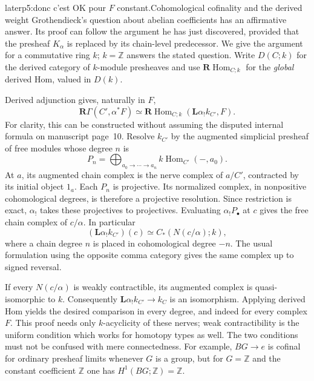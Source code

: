 \begin{dcomment}{later}{p5:donc c'est OK pour $F$ constant.}{Cohomological cofinality and the derived weight}
Grothendieck's question about abelian coefficients has an affirmative answer. Its proof can follow the argument he has just discovered, provided that the presheaf $K_\alpha$ is replaced by its chain-level predecessor. We give the argument for a commutative ring $k$; $k=\mathbb Z$ answers the stated question. Write $D(C;k)$ for the derived category of $k$-module presheaves and use $\mathbf R\operatorname{Hom}_{C;k}$ for the \emph{global} derived Hom, valued in $D(k)$.

Derived adjunction gives, naturally in $F$,
\[
 \mathbf R\Gamma(C',\alpha^*F)
 \simeq
 \mathbf R\operatorname{Hom}_{C;k}
       (\mathbf L\alpha_!k_{C'},F).
\]
For clarity, this can be constructed without assuming the disputed internal formula on manuscript page~10. Resolve $k_{C'}$ by the augmented simplicial presheaf of free modules whose degree $n$ is
\[
 P_n=\bigoplus_{a_0\to\cdots\to a_n} k\operatorname{Hom}_{C'}(-,a_0).
\]
At $a$, its augmented chain complex is the nerve complex of $a/C'$, contracted by its initial object $1_a$. Each $P_n$ is projective. Its normalized complex, in nonpositive cohomological degrees, is therefore a projective resolution. Since restriction is exact, $\alpha_!$ takes these projectives to projectives. Evaluating $\alpha_!P_\bullet$ at $c$ gives the free chain complex of $c/\alpha$. In particular
\[
 (\mathbf L\alpha_!k_{C'})(c)
 \simeq C_*(N(c/\alpha);k),
\]
where a chain degree $n$ is placed in cohomological degree $-n$. The usual formulation using the opposite comma category gives the same complex up to signed reversal.

If every $N(c/\alpha)$ is weakly contractible, its augmented complex is quasi-isomorphic to $k$. Consequently $\mathbf L\alpha_!k_{C'}\to k_C$ is an isomorphism. Applying derived Hom yields the desired comparison in every degree, and indeed for every complex $F$. This proof needs only $k$-acyclicity of these nerves; weak contractibility is the uniform condition which works for homotopy types as well. The two conditions must not be confused with mere connectedness. For example, $BG\to e$ is cofinal for ordinary presheaf limits whenever $G$ is a group, but for $G=\mathbb Z$ and the constant coefficient $\mathbb Z$ one has $H^1(BG;\mathbb Z)=\mathbb Z$.


\end{dcomment}
